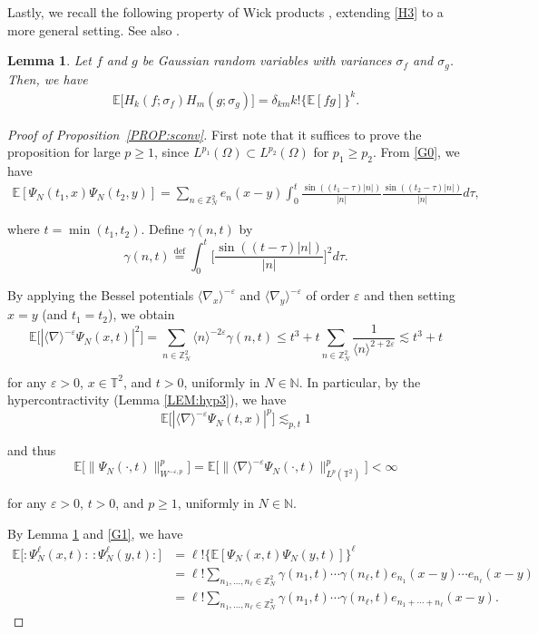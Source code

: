 \documentclass[letterpaper, 11pt,  reqno]{amsart}
\newtheorem{lemma}[theorem]{Lemma}
\newcommand{\1}{\hspace{0.5mm}\text{I}\hspace{0.5mm}}
\newcommand{\noi}{\noindent}
\newcommand{\Z}{\mathbb{Z}}
\newcommand{\T}{\mathbb{T}}
\newcommand{\E}{\mathbb{E}}
\newcommand{\dl}{\delta}
\newcommand{\nb}{\nabla}
\newcommand{\eps}{\varepsilon}
\newcommand{\g}{\gamma}
\newcommand{\s}{\sigma}
\renewcommand{\l}{\ell}
\renewcommand{\O}{\Omega}
\newcommand{\les}{\lesssim}
\newcommand{\jb}[1]
{\langle #1 \rangle}
\numberwithin{equation}{section}
\numberwithin{theorem}{section}
\begin{document}
Lastly, we recall the following property of Wick products \cite[Theorem I.3]{Simon},
extending \eqref{H3} to a more general setting.
See also \cite[Lemma 1.1.1]{Nu}.

\begin{lemma}\label{LEM:Wick}
Let $f$ and $g$ be Gaussian random variables with variances $\s_f$
and $\s_g$.
Then, we have 
\begin{align*}
\E\big[ H_k(f; \s_f) H_m(g; \s_g)\big] = \dl_{km} k! \big\{\E[ f g] \big\}^k.
\end{align*}
\end{lemma}



\begin{proof}[Proof of Proposition~\ref{PROP:sconv}]
First note that it suffices to prove the proposition for large $p \geq 1$,
since $L^{p_1}(\O) \subset L^{p_2}(\O)$ for $p_1 \geq p_2$.
From \eqref{G0},  we have 
\begin{align}
 \mathbb{E} [\Psi_N (t_1, x)  \Psi_N(t_2, y)] 
 = \sum_{n \in \mathbb{Z}^2_N} e_n (x-y)
  \int_0^t \frac{\sin ((t_1 - \tau ) | n |)}{| n |} \frac{\sin ((t_2 - \tau)
   | n |)}{| n |} d\tau ,
\label{G1}
\end{align}


\noi
where $t = \min(t_1, t_2)$.
Define  $\g(n,t)$  by
\[
   \g(n,t) \stackrel{\text{def}}{=}\int_0^t \bigg[ \frac{\sin ((t - \tau) | n |)}{| n |} \bigg]^2 d\tau.
 \]

\noi
By applying the Bessel potentials $\jb{\nb_x}^{-\eps}$ 
and $\jb{\nb_y}^{-\eps}$  of order $\eps$
and then setting $x = y$ (and $t_1 = t_2$), 
we obtain
\[ \E \big[| \jb{\nb}^{-\eps} \Psi_N (x, t) |^2\big] 
= \sum_{n \in \Z^2_N} \jb{n}^{-2\eps} \g(n,t)
   \leq t^3  + t \sum_{n \in \Z^2_N}
   \frac{1}{\jb{n}^{2+2\eps}} \les t^3 + t \]


\noi
for any $\eps > 0$, $x \in \T^2$, and $t > 0$, 
uniformly in $N \in \mathbb{N}$.
In particular, by the hypercontractivity (Lemma \ref{LEM:hyp3}), we have
\[ \E\big[ | \jb{\nb}^{-\eps} \Psi_N (t, x) |^p\big] \les_{p, t} 1 \]

\noi
and thus
\[\E \big[\| \Psi_N (\cdot, t) \|_{W^{-\eps,p}}^p \big]
=  \E \big[\| \jb{\nb}^{-\eps} \Psi_N (\cdot, t) \|_{L^p (\T^2)}^p \big]
< \infty \]

\noi
for any $\eps > 0$, $t > 0$,  and $p \geq 1$, uniformly in $N\in \mathbb{N}$. 

By Lemma \ref{LEM:Wick} 
and \eqref{G1},  we have
\begin{align*}
 \E \big[:\! \Psi^{\l}_N (x, t) \!:\,  :\! \Psi^{\l}_N (y, t) \!:\big] 
 & = \l! \big\{\mathbb{E} [\Psi_N (x, t) \Psi_N (y, t)]\big\}^{\l} \\
  & =\l! \sum_{n_1, \ldots, n_{\ell} \in \mathbb{Z}^2_N} \gamma (n_1, t) \cdots
  \gamma (n_{\ell}, t) e_{n_1} (x - y) \cdots e_{n_{\ell}} (x - y) \\
  & = \l!\sum_{n_1, \ldots, n_{\ell} \in \mathbb{Z}^2_N} \gamma (n_1, t) \cdots
  \gamma (n_{\ell}, t) e_{n_1 + \cdots + n_{\ell}} (x - y) .
\end{align*} 




\end{proof}
\end{document}
